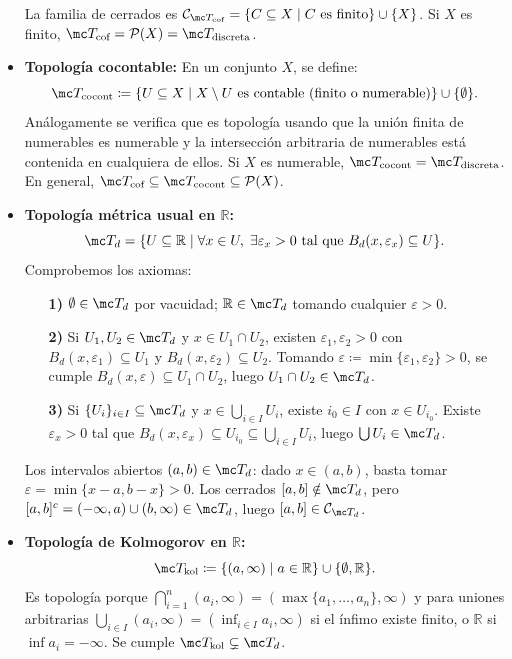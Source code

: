 \begin{ejem}
\begin{itemize}
    La familia de cerrados es \(\mathcal{C}_{\mc T_{\text{cof}}} = \{C \subseteq X \mid C \text{ es finito}\} \cup \{X\}\). Si \(X\) es finito, \(\mc T_{\text{cof}} = \mathcal{P}(X) = \mc T_{\text{discreta}}\).
    \item \textbf{Topología cocontable:} En un conjunto \(X\), se define:
    \[
        \mc T_{\text{cocont}} \coloneqq \{U \subseteq X \mid X \setminus U \text{ es contable (finito o numerable)}\} \cup \{\emptyset\} \text{}.
    \]
    Análogamente se verifica que es topología usando que la unión finita de numerables es numerable y la intersección arbitraria de numerables está contenida en cualquiera de ellos. Si \(X\) es numerable, \(\mc T_{\text{cocont}} = \mc T_{\text{discreta}}\). En general, \(\mc T_{\text{cof}} \subseteq \mc T_{\text{cocont}} \subseteq \mathcal{P}(X)\).
    \item \textbf{Topología métrica usual en \(\mathbb{R}\):}
    \[
        \mc T_d = \{U \subseteq \mathbb{R} \mid \forall x \in U, \; \exists \varepsilon_x > 0 \text{ tal que } B_d(x, \varepsilon_x) \subseteq U\} \text{}.
    \]
    Comprobemos los axiomas:
    \begin{enumerate}
        \item[\textbf{1)}] \(\emptyset \in \mc T_d\) por vacuidad; \(\mathbb{R} \in \mc T_d\) tomando cualquier \(\varepsilon > 0\).
        \item[\textbf{2)}] Si \(U_1, U_2 \in \mc T_d\) y \(x \in U_1 \cap U_2\), existen \(\varepsilon_1, \varepsilon_2 > 0\) con \(B_d(x, \varepsilon_1) \subseteq U_1\) y \(B_d(x, \varepsilon_2) \subseteq U_2\). Tomando \(\varepsilon \coloneqq \min\{\varepsilon_1, \varepsilon_2\} > 0\), se cumple \(B_d(x, \varepsilon) \subseteq U_1 \cap U_2\), luego \(U_1 \cap U_2 \in \mc T_d\).
        \item[\textbf{3)}] Si \(\{U_i\}_{i \in I} \subseteq \mc T_d\) y \(x \in \bigcup_{i \in I} U_i\), existe \(i_0 \in I\) con \(x \in U_{i_0}\). Existe \(\varepsilon_x > 0\) tal que \(B_d(x, \varepsilon_x) \subseteq U_{i_0} \subseteq \bigcup_{i \in I} U_i\), luego \(\bigcup U_i \in \mc T_d\).
    \end{enumerate}
    Los intervalos abiertos \((a, b) \in \mc T_d\): dado \(x \in (a, b)\), basta tomar \(\varepsilon = \min\{x - a, b - x\} > 0\). Los cerrados \([a, b] \notin \mc T_d\), pero \([a, b]^c = (-\infty, a) \cup (b, \infty) \in \mc T_d\), luego \([a, b] \in \mathcal{C}_{\mc T_d}\).
    \item \textbf{Topología de Kolmogorov en \(\mathbb{R}\):}
    \[
        \mc T_{\text{kol}} \coloneqq \{(a, \infty) \mid a \in \mathbb{R}\} \cup \{\emptyset, \mathbb{R}\} \text{}.
    \]
    Es topología porque \(\bigcap_{i=1}^n (a_i, \infty) = (\max\{a_1, \ldots, a_n\}, \infty)\) y para uniones arbitrarias \(\bigcup_{i \in I} (a_i, \infty) = (\inf_{i \in I} a_i, \infty)\) si el ínfimo existe finito, o \(\mathbb{R}\) si \(\inf a_i = -\infty\). Se cumple \(\mc T_{\text{kol}} \subsetneq \mc T_d\).
\end{itemize}
\end{ejem}

